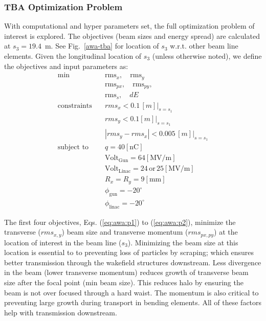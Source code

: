 \subsubsection{TBA Optimization Problem}
With computational and hyper parameters set, 
the full optimization problem of interest is explored.
The objectives (beam sizes and energy spread) are calculated at 
$s_3=19.4$~m. See Fig.~\ref{awa-tba} for location of $s_3$ w.r.t. other 
beam line elements. 
Given the longitudinal location of $s_3$ (unless otherwise noted), 
we define the objectives and input parameters as:
\begin{align}
\text{min}  \quad & \text{rms}_{x}, \quad \text{rms}_{y} \label{eq:awa:p1}\\
& \text{rms}_{px}, \quad \text{rms}_{py}, \label{eq:awa:p2}\\
& \text{rms}_{s}, \quad dE \label{eq:awa:p4} \\
\text{constraints} \quad & rms_x < 0.1 \, [m] |_{s=s_1}\label{eq:awa:c1}\\
\quad & rms_y < 0.1 [m] |_{s=s_1}\, \label{eq:awa:c2}\\
\quad & |rms_y - rms_x | < 0.005 \, [m] |_{s=s_1}\label{eq:awa:c3}\\
\text{subject to} \quad & q = 40 \left[\text{nC}\right] \label{eq:awa:firstconstr}\\
\quad & \text{Volt}_{\text{Gun}} = 64\left[\text{MV/m}\right] \label{eq:awa:lastconstr}\\
\quad & \text{Volt}_{\text{Linac}} = 24 \, \text{or} \, 25\left[\text{MV/m}\right] \\
\quad & R_x = R_y = 9 \left[\text{mm}\right] \label{eq:awa:firstdvar}\\
\quad & \phi_{\text{gun}} =-20^\circ \label{eq:awa:gphidvar}\\
\quad & \phi_{\text{linac}} =-20^\circ \label{eq:awa:lastdvar}
\end{align}



The first four objectives, Eqs. (\ref{eq:awa:p1}) to (\ref{eq:awa:p2}),
minimize the transverse ($rms_{x,y}$) beam size and transverse momentum ($rms_{px,py}$)
at the location of interest in the beam line ($s_3$).
Minimizing the beam size at this location is essential to 
to preventing loss of particles by scraping; 
which ensures better transmission through the wakefield structures downstream. 
Less divergence in the beam (lower transverse momentum) 
reduces growth of transverse beam size after the focal point (min beam size).
This reduces halo by ensuring the beam is not over focused through a hard waist.
The momentum is also critical to preventing large growth during transport in bending elements. 
All of these factors help with transmission downstream. 

